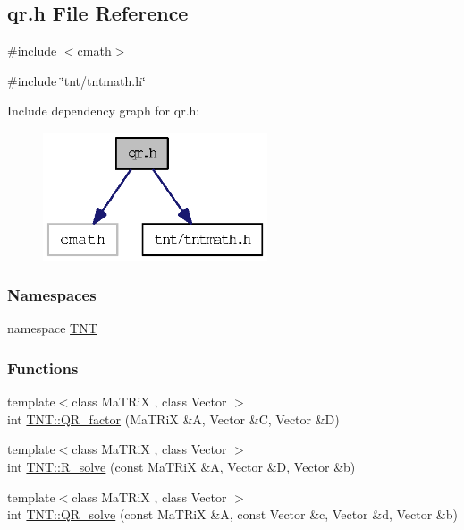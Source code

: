 \subsection{qr.h File Reference}
\label{qr_8h}
{\ttfamily \#include $<$cmath$>$}\par
{\ttfamily \#include \char`\"{}tnt/tntmath.h\char`\"{}}\par
Include dependency graph for qr.h:
\nopagebreak
\begin{figure}[H]
\begin{center}
\leavevmode
\includegraphics[width=188pt]{qr_8h__incl}
\end{center}
\end{figure}
\subsubsection*{Namespaces}
\begin{DoxyCompactItemize}
\item 
namespace \hyperlink{namespace_t_n_t}{TNT}
\end{DoxyCompactItemize}
\subsubsection*{Functions}
\begin{DoxyCompactItemize}
\item 
{\footnotesize template$<$class MaTRiX , class Vector $>$ }\\int \hyperlink{namespace_t_n_t_a995497fca15c0b39cf007994df2653fc}{TNT::QR\_\-factor} (MaTRiX \&A, Vector \&C, Vector \&D)
\item 
{\footnotesize template$<$class MaTRiX , class Vector $>$ }\\int \hyperlink{namespace_t_n_t_a4b8d4de03fba47c599760d2c670e1a84}{TNT::R\_\-solve} (const MaTRiX \&A, Vector \&D, Vector \&b)
\item 
{\footnotesize template$<$class MaTRiX , class Vector $>$ }\\int \hyperlink{namespace_t_n_t_aa769237a9cdf68476f149d633cd0bc52}{TNT::QR\_\-solve} (const MaTRiX \&A, const Vector \&c, Vector \&d, Vector \&b)
\end{DoxyCompactItemize}
